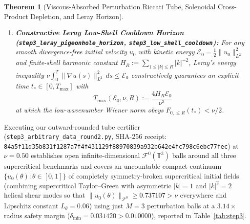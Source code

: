 \documentclass[11pt]{article}
\theoremstyle{plain}
\newtheorem{theorem}{Theorem}[section]
\theoremstyle{definition}
\begin{document}
\begin{theorem}[Viscous-Absorbed Perturbation Riccati Tube, Solenoidal Cross-Product Depletion, and Leray Horizon]
\begin{enumerate}
  In particular, every collinear triad ($\beta q = \alpha p$, $\beta \neq 0$) vanishes identically.
  \item \textbf{Constructive Leray Low-Shell Cooldown Horizon (\texttt{step3\_leray\_\allowbreak pigeonhole\_horizon}, \texttt{step3\_low\_shell\_cooldown}):} For \emph{any} smooth divergence-free initial velocity $u_0$ with kinetic energy $\mathcal{E}_0 = \frac{1}{2}\|u_0\|_{L^2}^2$ and finite-shell harmonic constant $H_R := \sum_{1 \le |k| \le R} |k|^{-2}$, Leray's energy inequality $\nu \int_0^T \|\nabla u(s)\|_{L^2}^2\,ds \le \mathcal{E}_0$ constructively guarantees an explicit time $t_* \in [0, T_{\max}]$ with
  \begin{equation}\label{eq:leray_horizon}
    T_{\max}(\mathcal{E}_0, \nu, R) := \frac{4 H_R \mathcal{E}_0}{\nu^3}
  \end{equation}
  at which the low-wavenumber Wiener norm obeys $F_{0,\le R}(t_*) < \nu / 2$.
\end{enumerate}
\end{theorem}

Executing our outward-rounded tube certifier (\texttt{step3\_arbitrary\_data\_round2.py}, SHA-256 receipt: \texttt{84a5f11d35b831f1\allowbreak 287a7f4f431129f8\allowbreak 8970839a932b642e\allowbreak 4fc798c6ebc77fec}) at $\nu = 0.50$ establishes open infinite-dimensional $\mathcal{F}^0(\mathbb{T}^3)$ balls around all three supercritical benchmarks and covers an uncountable compact continuum $\{u_0(\theta) : \theta \in [0,1]\}$ of completely symmetry-broken supercritical initial fields (combining supercritical Taylor--Green with asymmetric $|k|=1$ and $|k|^2=2$ helical shear modes so that $\|u_0(\theta)\|_{\mathcal{F}^0} \ge 0.737107 > \nu$ everywhere and Lipschitz constant $L_\theta = 0.06$) using just $M = 3$ perturbation balls at a $3.14\times$ radius safety margin ($\delta_{\min} = 0.031420 > 0.010000$), reported in Table~\ref{tab:step3}.
\end{document}
